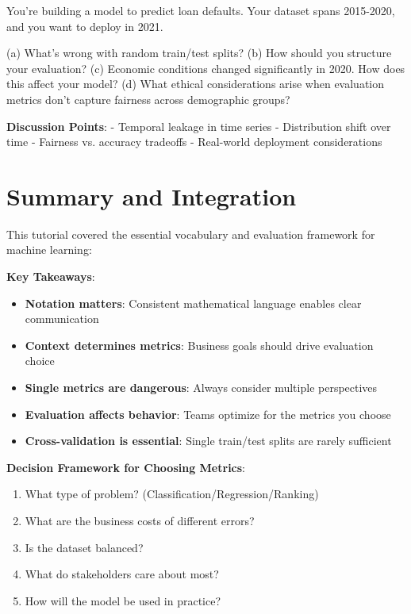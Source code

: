 \documentclass{article}
\newcounter{exercise}
\begin{document}
\begin{tcolorbox}[colback=gray!5!white,colframe=gray!75!black,title=Problem \stepcounter{exercise}\#\theexercise: Temporal Evaluation Ethics]
You're building a model to predict loan defaults. Your dataset spans 2015-2020, and you want to deploy in 2021.

(a) What's wrong with random train/test splits?
(b) How should you structure your evaluation?
(c) Economic conditions changed significantly in 2020. How does this affect your model?
(d) What ethical considerations arise when evaluation metrics don't capture fairness across demographic groups?

\textbf{Discussion Points}:
- Temporal leakage in time series
- Distribution shift over time  
- Fairness vs. accuracy tradeoffs
- Real-world deployment considerations
\end{tcolorbox}

\section{Summary and Integration}

This tutorial covered the essential vocabulary and evaluation framework for machine learning:

\textbf{Key Takeaways}:
\begin{itemize}
    \item \textbf{Notation matters}: Consistent mathematical language enables clear communication
    \item \textbf{Context determines metrics}: Business goals should drive evaluation choice
    \item \textbf{Single metrics are dangerous}: Always consider multiple perspectives
    \item \textbf{Evaluation affects behavior}: Teams optimize for the metrics you choose
    \item \textbf{Cross-validation is essential}: Single train/test splits are rarely sufficient
\end{itemize}

\textbf{Decision Framework for Choosing Metrics}:
\begin{enumerate}
    \item What type of problem? (Classification/Regression/Ranking)
    \item What are the business costs of different errors?
    \item Is the dataset balanced?
    \item What do stakeholders care about most?
    \item How will the model be used in practice?
\end{enumerate}
\end{document}
